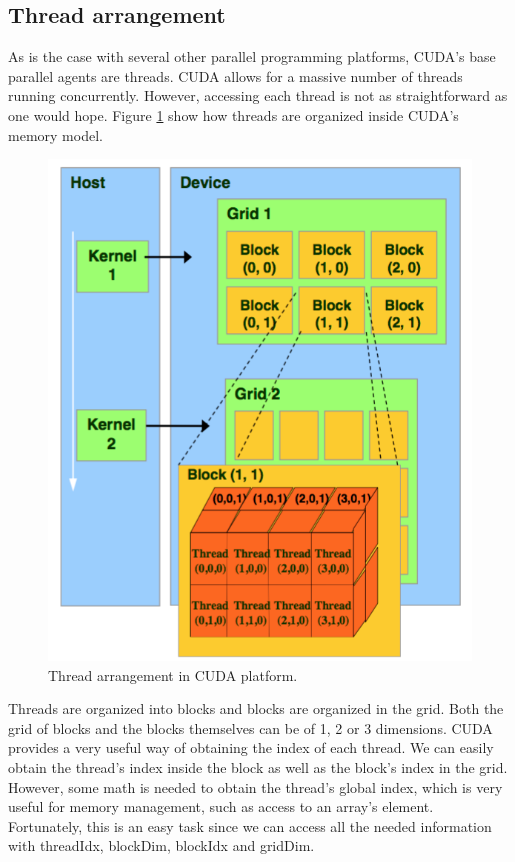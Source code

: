 \documentclass[12pt, openany]{book}
\begin{document}
\subsection{Thread arrangement}
As is the case with several other parallel programming platforms, CUDA's base parallel agents are threads. CUDA allows for a massive number of threads running concurrently. However, accessing each thread is not as straightforward as one would hope. Figure \ref{fig:threads} show how threads are organized inside CUDA's memory model.

\begin{figure}[H]
	\centering
	\includegraphics[width=0.6\linewidth]{Resources/Images/threadmapping.png}
	\caption{Thread arrangement in CUDA platform.}
	\label{fig:threads}
\end{figure}

Threads are organized into blocks and blocks are organized in the grid. Both the grid of blocks and the blocks themselves can be of 1, 2 or 3 dimensions. CUDA provides a very useful way of obtaining the index of each thread. We can easily obtain the thread's index inside the block as well as the block's index in the grid. However, some math is needed to obtain the thread's global index, which is very useful for memory management, such as access to an array's element. Fortunately, this is an easy task since we can access all the needed information with threadIdx, blockDim, blockIdx and gridDim.
\end{document}
